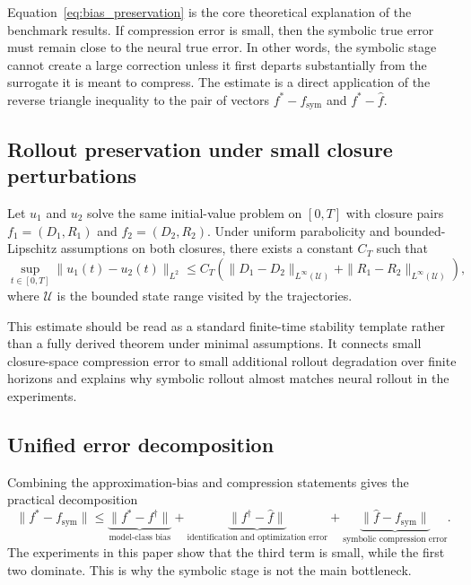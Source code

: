 Equation~\eqref{eq:bias_preservation} is the core theoretical explanation of the benchmark results. If compression error is small, then the symbolic true error must remain close to the neural true error. In other words, the symbolic stage cannot create a large correction unless it first departs substantially from the surrogate it is meant to compress.
The estimate is a direct application of the reverse triangle inequality to the pair of vectors $f^\ast-f_{\text{sym}}$ and $f^\ast-\widehat{f}$.

\subsection{Rollout preservation under small closure perturbations}

\begin{remark}
Let $u_1$ and $u_2$ solve the same initial-value problem on $[0,T]$ with closure pairs $f_1=(D_1,R_1)$ and $f_2=(D_2,R_2)$. Under uniform parabolicity and bounded-Lipschitz assumptions on both closures, there exists a constant $C_T$ such that
\begin{equation}
\sup_{t \in [0,T]} \|u_1(t) - u_2(t)\|_{L^2}
\le
C_T \left(
\|D_1-D_2\|_{L^\infty(\mathcal{U})} + \|R_1-R_2\|_{L^\infty(\mathcal{U})}
\right),
\end{equation}
where $\mathcal{U}$ is the bounded state range visited by the trajectories.
\end{remark}

This estimate should be read as a standard finite-time stability template rather than a fully derived theorem under minimal assumptions. It connects small closure-space compression error to small additional rollout degradation over finite horizons and explains why symbolic rollout almost matches neural rollout in the experiments.

\subsection{Unified error decomposition}

Combining the approximation-bias and compression statements gives the practical decomposition
\begin{equation}
\|f^\ast - f_{\text{sym}}\|
\le
\underbrace{\|f^\ast - f^\dagger\|}_{\text{model-class bias}}
+
\underbrace{\|f^\dagger - \widehat{f}\|}_{\text{identification and optimization error}}
+
\underbrace{\|\widehat{f} - f_{\text{sym}}\|}_{\text{symbolic compression error}}.
\label{eq:total_decomposition}
\end{equation}
The experiments in this paper show that the third term is small, while the first two dominate. This is why the symbolic stage is not the main bottleneck.

